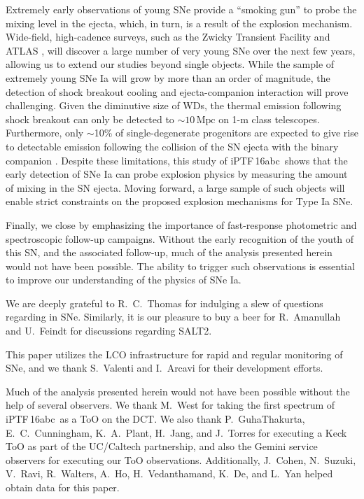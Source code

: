 \documentclass[twocolumn]{aastex61}
\newcommand{\abc}{iPTF\,16abc}
\begin{document}
Extremely early observations of young SNe provide a ``smoking
gun'' to probe the mixing level in the ejecta, which, in turn, is 
a result of the explosion mechanism. Wide-field, high-cadence surveys, such as the Zwicky Transient Facility \citep{2016PASP..128h4501B} and ATLAS \citep{2011PASP..123...58T,2013RSPTA.37120269T}, will discover a large number of very young SNe over the next few years, allowing us to extend our studies beyond single objects. While the sample of extremely young SNe Ia will grow by more than an order of magnitude, the detection of shock breakout cooling and ejecta-companion interaction will prove challenging. Given the diminutive size of WDs, the thermal emission following shock breakout can only be detected to $\sim 10\,\mathrm{Mpc}$ on 1-m class telescopes. Furthermore, only $\sim$10\% of single-degenerate progenitors are expected to give rise to detectable emission following the collision of the SN ejecta with the binary companion \citep{2010ApJ...708.1025K}. Despite these limitations, this study of \abc\ shows that the early detection of SNe Ia can probe explosion physics by measuring the amount of mixing in the SN ejecta. Moving forward, a large sample of such objects will enable strict constraints on the proposed explosion mechanisms for Type Ia SNe.

Finally, we close by emphasizing the importance of fast-response photometric and spectroscopic follow-up campaigns. Without the early recognition of the youth of this SN, and the associated follow-up, much of the analysis presented herein would not have been possible. The ability to trigger such observations is essential to improve our understanding of the physics of SNe Ia.

\acknowledgements

We are deeply grateful to R.~C.~Thomas for indulging a slew of questions regarding  in SNe. Similarly, it is our pleasure to buy a beer for R.~Amanullah and U.~Feindt for discussions regarding SALT2. 

This paper utilizes the LCO infrastructure for rapid and regular monitoring of SNe, and we thank S.~Valenti and I.~Arcavi for their development efforts.

Much of the analysis presented herein would not have been possible without the help of several observers. We thank M.~West for taking the first spectrum of \abc\ as a ToO on the DCT. We also thank P.~GuhaThakurta, E.~C.~Cunningham, K.~A.~Plant, H.~Jang, and J.~Torres for executing a Keck ToO as part of the UC/Caltech partnership, and also the Gemini service observers for executing our ToO observations. Additionally, J.~Cohen, N.~Suzuki, V.~Ravi, R.~Walters, A.~Ho, H.~Vedanthamand, K.~De, and L.~Yan helped obtain data for this paper.
\end{document}
